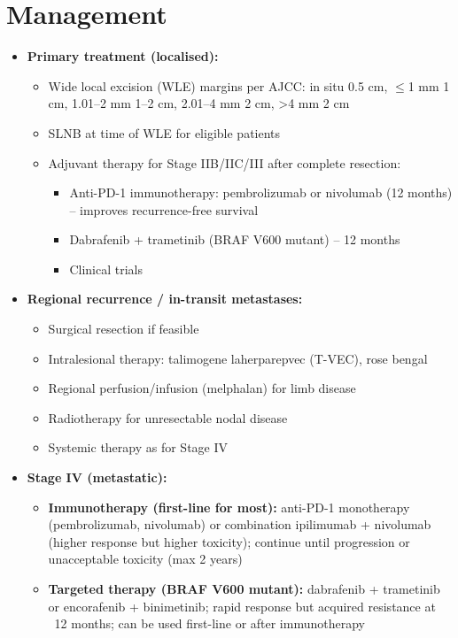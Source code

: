 \section*{Management}
\begin{itemize}
    \item \textbf{Primary treatment (localised):}
    \begin{itemize}
        \item Wide local excision (WLE) margins per AJCC: in situ 0.5 cm, $\le$1 mm 1 cm, 1.01--2 mm 1--2 cm, 2.01--4 mm 2 cm, >4 mm 2 cm
        \item SLNB at time of WLE for eligible patients
        \item Adjuvant therapy for Stage IIB/IIC/III after complete resection:
        \begin{itemize}
            \item Anti-PD-1 immunotherapy: pembrolizumab or nivolumab (12 months) -- improves recurrence-free survival
            \item Dabrafenib + trametinib (BRAF V600 mutant) -- 12 months
            \item Clinical trials
        \end{itemize}
    \end{itemize}
    \item \textbf{Regional recurrence / in-transit metastases:}
    \begin{itemize}
        \item Surgical resection if feasible
        \item Intralesional therapy: talimogene laherparepvec (T-VEC), rose bengal
        \item Regional perfusion/infusion (melphalan) for limb disease
        \item Radiotherapy for unresectable nodal disease
        \item Systemic therapy as for Stage IV
    \end{itemize}
    \item \textbf{Stage IV (metastatic):}
    \begin{itemize}
        \item \textbf{Immunotherapy (first-line for most):} anti-PD-1 monotherapy (pembrolizumab, nivolumab) or combination ipilimumab + nivolumab (higher response but higher toxicity); continue until progression or unacceptable toxicity (max 2 years)
        \item \textbf{Targeted therapy (BRAF V600 mutant):} dabrafenib + trametinib or encorafenib + binimetinib; rapid response but acquired resistance at ~12 months; can be used first-line or after immunotherapy

\end{itemize}
\end{itemize}

